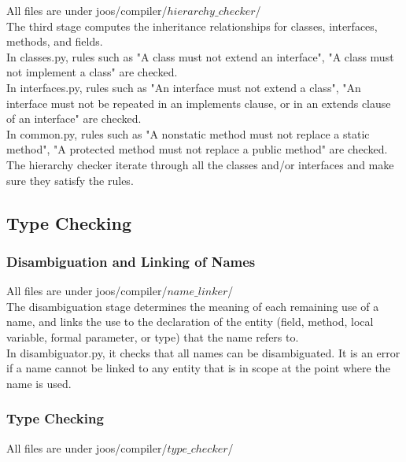 \documentclass[12pt, a4paper]{article}
\begin{document}
All files are under joos/compiler/$hierarchy\_checker$/ \\

The third stage computes the inheritance relationships for classes, interfaces, methods, and fields. \\

In classes.py, rules such as "A class must not extend an interface", "A class must not implement a class" are checked. \\

In interfaces.py, rules such as "An interface must not extend a class", "An interface must not be repeated in an implements clause, or in an extends clause of an interface" are checked. \\

In common.py, rules such as "A nonstatic method must not replace a static method", "A protected method must not replace a public method" are checked. \\

The hierarchy checker iterate through all the classes and/or interfaces and make sure they satisfy the rules.\\

\subsection{Type Checking}

\subsubsection{Disambiguation and Linking of Names}

All files are under joos/compiler/$name\_linker$/ \\

The disambiguation stage determines the meaning of each remaining use of a name, and links the use to the declaration of the entity (field, method, local variable, formal parameter, or type) that the name refers to. \\

In disambiguator.py, it checks that all names can be disambiguated. It is an error if a name cannot be linked to any entity that is in scope at the point where the name is used. 

\subsubsection{Type Checking}

All files are under joos/compiler/$type\_checker$/ \\
\end{document}
